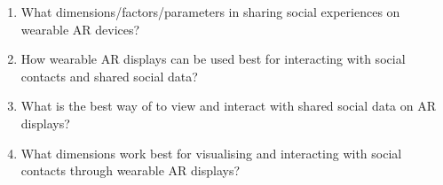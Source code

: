 \begin{enumerate}[label=RQ\arabic*]
    \item{\label{rq:continuum}What dimensions/factors/parameters in sharing social experiences on wearable AR devices?
    }
    \item{\label{rq:interaction}How wearable AR displays can be used best for interacting with social contacts and shared social data?
    }
    \item{\label{rq:data}What is the best way of to view and interact with shared social data on AR displays?
    }
    \item{\label{rq:people}What dimensions work best for visualising and interacting with social contacts through wearable AR displays?
    }
\end{enumerate}

